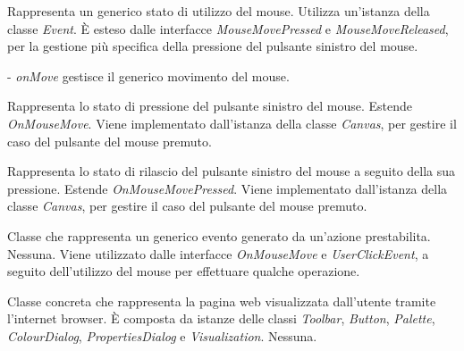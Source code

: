 Rappresenta un generico stato di utilizzo del mouse.
Utilizza un'istanza della classe \textit{Event}.
\` E esteso dalle interfacce \textit{MouseMovePressed} e \textit{MouseMoveReleased}, per la gestione pi\` u specifica della pressione del pulsante sinistro del mouse.
\begin{elencopuntato}[\normindent]
\item[-]  \textit{onMove} gestisce il generico movimento del mouse.
\end{elencopuntato}

Rappresenta lo stato di pressione del pulsante sinistro del mouse.
Estende \textit{OnMouseMove}.
Viene implementato dall'istanza della classe \textit{Canvas}, per gestire il caso del pulsante del mouse premuto.

Rappresenta lo stato di rilascio del pulsante sinistro del mouse a seguito della sua pressione.
Estende \textit{OnMouseMovePressed}.
Viene implementato dall'istanza della classe \textit{Canvas}, per gestire il caso del pulsante del mouse premuto.

Classe che rappresenta un generico evento generato da un'azione prestabilita.
Nessuna.
Viene utilizzato dalle interfacce \textit{OnMouseMove} e \textit{UserClickEvent}, a seguito dell'utilizzo del mouse per effettuare qualche operazione.

Classe concreta che rappresenta la pagina web visualizzata dall'utente tramite l'internet browser.
\` E composta da istanze delle classi \textit{Toolbar}, \textit{Button}, \textit{Palette}, \textit{ColourDialog}, \textit{PropertiesDialog} e \textit{Visualization}.
Nessuna.

